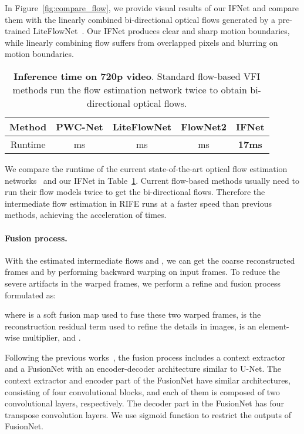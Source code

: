 \documentclass[10pt,twocolumn,letterpaper]{article}
\begin{document}
In Figure~\ref{fig:compare_flow}, we provide visual results of our IFNet and compare them with the linearly combined bi-directional optical flows generated by a pre-trained LiteFlowNet~\cite{hui2018liteflownet}. Our IFNet produces clear and sharp motion boundaries, while linearly combining flow suffers from overlapped pixels and blurring on motion boundaries. 

\begin{table}[t]
	\caption{\textbf{Inference time on 720p video}. Standard flow-based VFI methods run the flow estimation network twice to obtain bi-directional optical flows.}\label{tab:runtime}
	\small
	\begin{tabular}{ccccc}
		\hline
		Method&PWC-Net&LiteFlowNet&FlowNet2&IFNet\\ \hline
		Runtime & ms & ms & ms & \textbf{17ms} \\ \hline
	\end{tabular}
	\vspace{-1em}
\end{table}

We compare the runtime of the current state-of-the-art optical flow estimation networks~\cite{sun2018pwc, hui2018liteflownet, ilg2017flownet} and our IFNet in Table~\ref{tab:runtime}. Current flow-based methods usually need to run their flow models twice to get the bi-directional flows. Therefore the intermediate flow estimation in RIFE runs at a faster speed than previous methods, achieving the acceleration of  times.







\paragraph{Fusion process.} With the estimated intermediate flows  and , we can get the coarse reconstructed frames  and  by performing backward warping on input frames. To reduce the severe artifacts in the warped frames, we perform a refine and fusion process formulated as: 

where  is a soft fusion map used to fuse these two warped frames,  is the reconstruction residual term used to refine the details in images,  is an element-wise multiplier, and .

Following the previous works~\cite{jiang2018super, bao2019depth, niklaus2020softmax}, the fusion process includes a context extractor and a FusionNet with an encoder-decoder architecture similar to U-Net. The context extractor and encoder part of the FusionNet have similar architectures, consisting of four convolutional blocks, and each of them is composed of two  convolutional layers, respectively. The decoder part in the FusionNet has four transpose convolution layers. We use sigmoid function to restrict the outputs of FusionNet.
\end{document}
